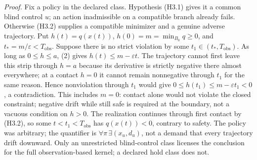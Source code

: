 \documentclass[11pt]{article}
\theoremstyle{definition}
\begin{document}
\emph{Proof.} Fix a policy in the declared class. Hypothesis (H3.1)
gives it a common blind control \(u\); an action inadmissible on a
compatible branch already fails. Otherwise (H3.2) supplies a compatible
minimizer and a genuine adverse trajectory. Put
\(h(t)=q(x(t))\), \(h(0)=m=\min_{B_0}q\ge0\), and
\(t_*=m/\varepsilon<T_{\mathrm{obs}}\). Suppose there is no strict
violation by some \(t_1\in(t_*,T_{\mathrm{obs}})\). As long as
\(0\le h\le a\), (2) gives \(h(t)\le m-\varepsilon t\).
The trajectory cannot first leave this strip through \(h=a\) because
its derivative is strictly negative there almost everywhere; at a
contact \(h=0\) it cannot remain nonnegative through \(t_1\)
for the same reason. Hence nonviolation through \(t_1\) would give
\(0\le h(t_1)\le m-\varepsilon t_1<0\), a contradiction.
This includes \(m=0\): contact alone would not violate the closed constraint; negative drift while still safe is required at the boundary,
not a vacuous condition on \(h>0\). The realization continues through
first contact by (H3.2), so some \(t<t_1<T_{\mathrm{obs}}\) has
\(q(x(t))<0\), contrary to safety. The policy was arbitrary; the
quantifier is \(\forall\pi\,\exists(x_u,d_u)\), not a demand that
every trajectory drift downward.
Only an unrestricted blind-control class licenses the conclusion for the
full observation-based kernel; a declared hold class does not.
\end{document}
